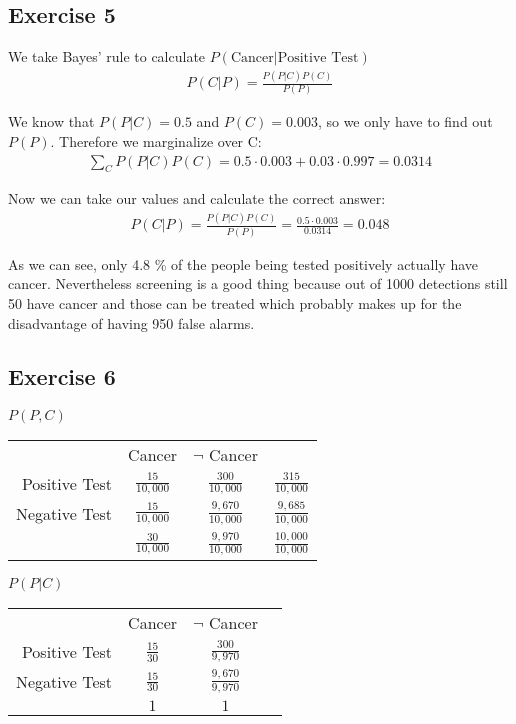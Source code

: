 \subsection*{Exercise 5}
We take Bayes' rule to calculate $P(\mbox{Cancer}|\mbox{Positive Test})$
\begin{align*}
P(C|P) = \frac{P(P|C)P(C)}{P(P)}
\end{align*}

We know that $P(P|C) = 0.5$ and $P(C) = 0.003$, so we only have to find out $P(P)$. Therefore we marginalize over C:
\begin{align*}
\sum_{C}{P(P|C)P(C)} = 0.5 \cdot 0.003 + 0.03 \cdot 0.997 = 0.0314
\end{align*}

Now we can take our values and calculate the correct answer:
\begin{align*}
P(C|P) = \frac{P(P|C)P(C)}{P(P)} = \frac{0.5 \cdot 0.003}{0.0314} = 0.048
\end{align*}

As we can see, only 4.8 \% of the people being tested positively actually have cancer. Nevertheless screening is a good thing because out of 1000 detections still 50 have cancer and those can be treated which probably makes up for the disadvantage of having 950 false alarms.  

\subsection*{Exercise 6}
\textbf{$P(P, C)$}
\begin{tabular}{ r|c|c|l }
\multicolumn{1}{r}{}
      &  \multicolumn{1}{c}{Cancer}
               &  \multicolumn{1}{c}{$\neg$ Cancer} \\
               \cline{2-3}
Positive Test  & $\frac{15}{10,000}$ & $\frac{  300}{10,000}$     & $\frac{  315}{10,000}$\\ 
               \cline{2-3}
Negative Test  & $\frac{15}{10,000}$ & $\frac{9,670}{10,000}$     & $\frac{9,685}{10,000}$\\
               \cline{2-3}
\multicolumn{1}{r}{} 
      & \multicolumn{1}{c}{$\frac{30}{10,000}$} 
              & \multicolumn{1}{c}{$\frac{9,970}{10,000}$}
                      & \multicolumn{1}{c}{$\frac{10,000}{10,000}$}\\
\end{tabular}

\textbf{$P(P|C)$}
\begin{tabular}{ r|c|c|l }
\multicolumn{1}{r}{}
      &  \multicolumn{1}{c}{Cancer}
               &  \multicolumn{1}{c}{$\neg$ Cancer} \\
               \cline{2-3}
Positive Test  & $\frac{15}{30}$ & $\frac{ 300}{9,970}$     & \\ 
               \cline{2-3}
Negative Test  & $\frac{15}{30}$ & $\frac{9,670}{9,970}$     & \\
               \cline{2-3}
\multicolumn{1}{r}{} 
      & \multicolumn{1}{c}{$1$} 
              & \multicolumn{1}{c}{$1$} 
                      & \multicolumn{1}{c}{}\\
\end{tabular}

